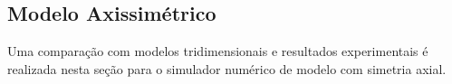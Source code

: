 \documentclass[a4paper,portuges,12pt]{article}
\begin{document}
\subsection{Modelo Axissimétrico}

Uma comparação com modelos tridimensionais e resultados experimentais é
realizada nesta seção para o simulador numérico de modelo com simetria
axial. 

 \begin{figure}[h]
 	\begin{center}
 		\hspace{0.7cm}
 		\hspace{0.7cm}

\end{center}
\end{figure}
\end{document}
